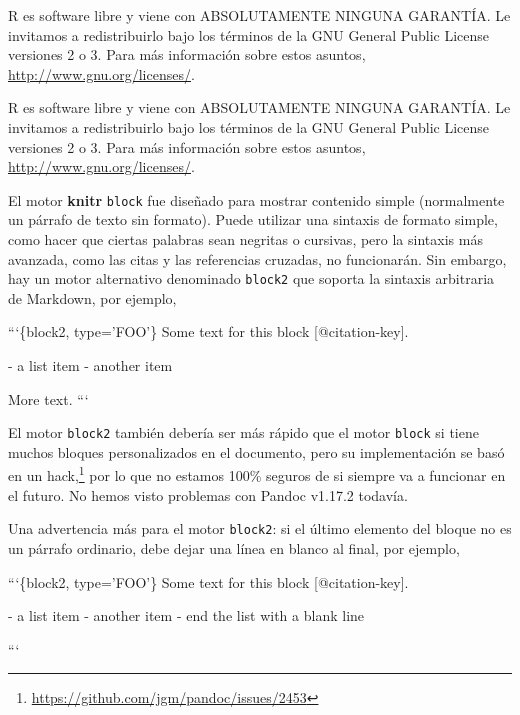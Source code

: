 \documentclass[12pt,]{krantz}
\makeatletter
\newenvironment{Shaded}{\begin{snugshade}}{\end{snugshade}}
\newcommand{\FloatTok}[1]{\textcolor[rgb]{0.00,0.00,0.81}{#1}}
\newcommand{\NormalTok}[1]{#1}
\renewcommand{\href}[2]{#2\footnote{\url{#1}}}
\newenvironment{kframe}{%
\medskip{}
\setlength{\fboxsep}{.8em}
 \def\at@end@of@kframe{}%
 \ifinner\ifhmode%
  \def\at@end@of@kframe{\end{minipage}}%
  \begin{minipage}{\columnwidth}%
 \fi\fi%
 \def\FrameCommand##1{\hskip\@totalleftmargin \hskip-\fboxsep
 \colorbox{shadecolor}{##1}\hskip-\fboxsep
     \hskip-\linewidth \hskip-\@totalleftmargin \hskip\columnwidth}%
 \MakeFramed {\advance\hsize-\width
   \@totalleftmargin\z@ \linewidth\hsize
   \@setminipage}}%
 {\par\unskip\endMakeFramed%
 \at@end@of@kframe}
\renewenvironment{Shaded}{\begin{kframe}}{\end{kframe}}
\theoremstyle{definition}
\theoremstyle{definition}
\theoremstyle{definition}
\theoremstyle{remark}
\let\BeginKnitrBlock\begin \let\EndKnitrBlock\end
\makeatother
\begin{document}
\BeginKnitrBlock{rmdtip}
R es software libre y viene con ABSOLUTAMENTE NINGUNA GARANTÍA. Le
invitamos a redistribuirlo bajo los términos de la GNU General Public
License versiones 2 o 3. Para más información sobre estos asuntos,
\url{http://www.gnu.org/licenses/}.
\EndKnitrBlock{rmdtip}

\BeginKnitrBlock{rmdwarning}
R es software libre y viene con ABSOLUTAMENTE NINGUNA GARANTÍA. Le
invitamos a redistribuirlo bajo los términos de la GNU General Public
License versiones 2 o 3. Para más información sobre estos asuntos,
\url{http://www.gnu.org/licenses/}.
\EndKnitrBlock{rmdwarning}

El motor \textbf{knitr} \texttt{block} fue diseñado para mostrar
contenido simple (normalmente un párrafo de texto sin formato). Puede
utilizar una sintaxis de formato simple, como hacer que ciertas palabras
sean negritas o cursivas, pero la sintaxis más avanzada, como las citas
y las referencias cruzadas, no funcionarán. Sin embargo, hay un motor
alternativo denominado \texttt{block2} que soporta la sintaxis
arbitraria de Markdown, por ejemplo,

\begin{Shaded}
\begin{Highlighting}[]
\NormalTok{```\{block2, type='FOO'\}}
\NormalTok{Some text for this block [@citation-key].}

\NormalTok{- }\FloatTok{a list item}
\FloatTok{- another item}

\NormalTok{More text.}
\NormalTok{```}
\end{Highlighting}
\end{Shaded}

El motor \texttt{block2} también debería ser más rápido que el motor
\texttt{block} si tiene muchos bloques personalizados en el documento,
pero su implementación se basó en
\href{https://github.com/jgm/pandoc/issues/2453}{un hack,} por lo que no
estamos 100\% seguros de si siempre va a funcionar en el futuro. No
hemos visto problemas con Pandoc v1.17.2 todavía.

Una advertencia más para el motor \texttt{block2}: si el último elemento
del bloque no es un párrafo ordinario, debe dejar una línea en blanco al
final, por ejemplo,

\begin{Shaded}
\begin{Highlighting}[]
\NormalTok{```\{block2, type='FOO'\}}
\NormalTok{Some text for this block [@citation-key].}

\NormalTok{- }\FloatTok{a list item}
\FloatTok{- another item}
\FloatTok{- end the list with a blank line}

\NormalTok{```}
\end{Highlighting}
\end{Shaded}
\end{document}
